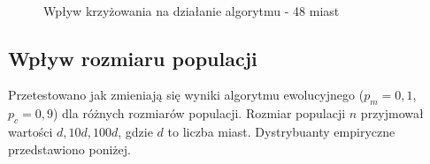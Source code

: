 \documentclass[12pt, a4paper]{article}
\begin{document}
\begin{figure}[H]
\centering
\mbox{\quad
{} 
}
\caption{Wpływ krzyżowania na działanie algorytmu - 48 miast}
\end{figure}

\subsection{Wpływ rozmiaru populacji}

Przetestowano jak zmieniają się wyniki algorytmu ewolucyjnego ($p_m=0,1$, $p_c=0,9$)
dla różnych rozmiarów populacji. Rozmiar populacji $n$ przyjmował wartości $d, 10d, 100d$, gdzie $d$
to liczba miast. Dystrybuanty empiryczne przedstawiono poniżej.
\end{document}
